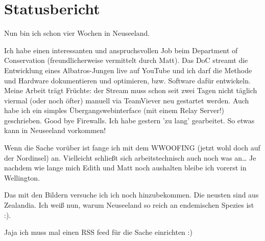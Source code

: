 \chapter{Statusbericht}

Nun bin ich schon vier Wochen in Neuseeland.

Ich habe einen interessanten und anspruchsvollen Job beim Department of
Conservation (freundlicherweise vermittelt durch Matt). Das DoC streamt
die Entwicklung eines Albatros-Jungen live auf YouTube und ich darf die
Methode und Hardware dokumentieren und optimieren, bzw. Software dafür
entwickeln. Meine Arbeit trägt Früchte: der Stream muss schon seit zwei
Tagen nicht täglich viermal (oder noch öfter) manuell via TeamViever neu
gestartet werden. Auch habe ich ein simples Übergangswebinterface (mit
einem Relay Server!) geschrieben. Good bye Firewalls. Ich habe gestern
'zu lang' gearbeitet. So etwas kann in Neuseeland vorkommen!


Wenn die Sache vorüber ist fange ich mit dem WWOOFING (jetzt wohl doch
auf der Nordinsel) an. Vielleicht schließt sich arbeitstechnisch auch
noch was an\ldots{} Je nachdem wie lange mich Edith und Matt noch
aushalten bleibe ich vorerst in Wellington.

Das mit den Bildern versuche ich ich noch hinzubekommen. Die neusten
sind aus Zealandia. Ich weiß nun, warum Neuseeland so reich an
endemischen Spezies ist :).

Jaja ich muss mal einen RSS feed für die Sache einrichten :)
